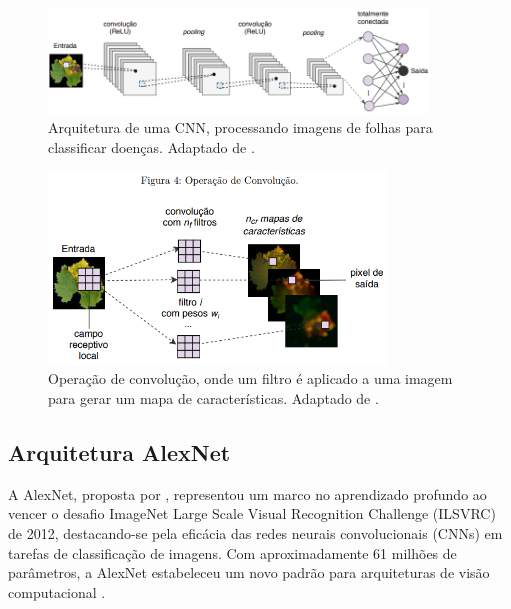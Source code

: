 \begin{figure}[h]
    \centering
    \includegraphics[width=0.9\textwidth]{figuras/capitulo 3/cnn.png}
    \caption{Arquitetura de uma CNN, processando imagens de folhas para classificar doenças. Adaptado de \cite{RezendeTese}.}
    \label{fig:cnn}
\end{figure}



\begin{figure}[h]
    \centering
    \includegraphics[width=0.8\textwidth]{figuras/capitulo 3/convolution_process.png}
    \caption{Operação de convolução, onde um filtro é aplicado a uma imagem para gerar um mapa de características. Adaptado de \cite{RezendeTese}.}
    \label{fig:convolution}
\end{figure}











\subsection{Arquitetura AlexNet}
\label{subsec:alexnet}

A AlexNet, proposta por \cite{Krizhevsky2012}, representou um marco no aprendizado profundo ao vencer o desafio ImageNet Large Scale Visual Recognition Challenge (ILSVRC) de 2012, destacando-se pela eficácia das redes neurais convolucionais (CNNs) em tarefas de classificação de imagens. Com aproximadamente 61 milhões de parâmetros, a AlexNet estabeleceu um novo padrão para arquiteturas de visão computacional \cite{Krizhevsky2012}.

